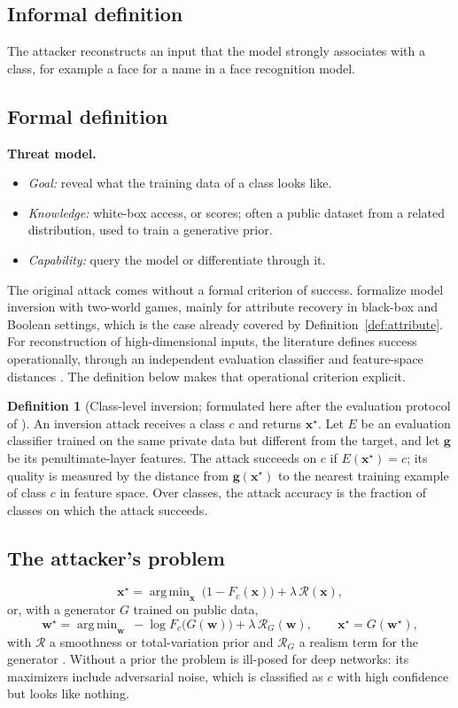 \documentclass[10pt,a4paper]{extarticle}
\theoremstyle{definition}
\newtheorem{definition}{Definition}[section]
\newcommand{\x}{\mathbf{x}}
\DeclareMathOperator*{\argmin}{arg\,min}
\newcommand{\threatmodel}[3]{%
\par\noindent\textbf{Threat model.}
\begin{itemize}[leftmargin=1.5em]
  \item \emph{Goal:} #1
  \item \emph{Knowledge:} #2
  \item \emph{Capability:} #3
\end{itemize}\par}
\begin{document}
\subsection{Informal definition}

The attacker reconstructs an input that the model strongly associates with a class, for example a face for a name in a face recognition model.

\subsection{Formal definition}

\threatmodel{reveal what the training data of a class looks like.}{white-box access, or scores; often a public dataset from a related distribution, used to train a generative prior.}{query the model or differentiate through it.}

The original attack \citep{fredrikson2015model} comes without a formal criterion of success. \citet{wu2016methodology} formalize model inversion with two-world games, mainly for attribute recovery in black-box and Boolean settings, which is the case already covered by Definition~\ref{def:attribute}. For reconstruction of high-dimensional inputs, the literature defines success operationally, through an independent evaluation classifier and feature-space distances \citep{zhang2020secret}. The definition below makes that operational criterion explicit.

\begin{definition}[Class-level inversion; formulated here after the evaluation protocol of \citealp{zhang2020secret}]\label{def:inversion}
An inversion attack receives a class $c$ and returns $\x^\star$. Let $E$ be an evaluation classifier trained on the same private data but different from the target, and let $\mathbf{g}$ be its penultimate-layer features. The attack succeeds on $c$ if $E(\x^\star)=c$; its quality is measured by the distance from $\mathbf{g}(\x^\star)$ to the nearest training example of class $c$ in feature space. Over classes, the attack accuracy is the fraction of classes on which the attack succeeds.
\end{definition}

\subsection{The attacker's problem}

\[
\x^\star=\argmin_{\x}\ \big(1-F_c(\x)\big)+\lambda\,\mathcal{R}(\x),
\]
or, with a generator $G$ trained on public data,
\[
\mathbf{w}^\star=\argmin_{\mathbf{w}}\ -\log F_c\big(G(\mathbf{w})\big)+\lambda\,\mathcal{R}_G(\mathbf{w}),\qquad \x^\star=G(\mathbf{w}^\star),
\]
with $\mathcal{R}$ a smoothness or total-variation prior \citep{fredrikson2015model} and $\mathcal{R}_G$ a realism term for the generator \citep{zhang2020secret}. Without a prior the problem is ill-posed for deep networks: its maximizers include adversarial noise, which is classified as $c$ with high confidence but looks like nothing.
\end{document}
